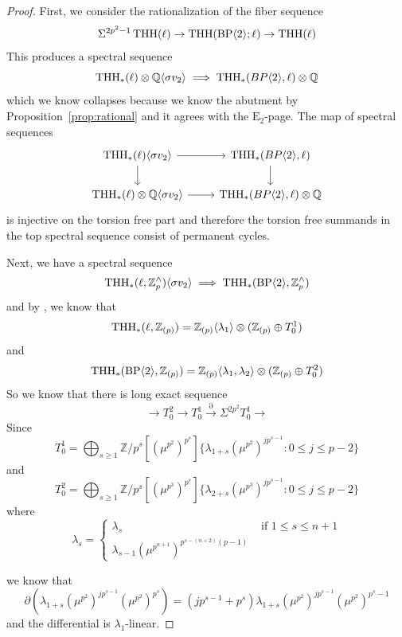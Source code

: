 \begin{proof}
First, we consider the rationalization of the fiber sequence 
\[ 
\Sigma^{2p^2-1}\operatorname{THH}(\ell)\to \operatorname{THH}(\mathrm{BP}\langle 2\rangle ;\ell)\to \operatorname{THH}(\ell)
\]
This produces a spectral sequence 
\[ 
\operatorname{THH}_*(\ell)\otimes \mathbb{Q}\langle \sigma v_2\rangle \implies \operatorname{THH}_*(BP\langle 2\rangle,\ell)\otimes \mathbb{Q}
\]
which we know collapses because we know the abutment by Proposition~\ref{prop:rational} and it agrees with the $\mathrm{E}_2$-page. The map of spectral sequences 
\[ 
\begin{tikzcd}
\THH_*(\ell)\langle \sigma v_2\rangle \ar[d] \arrow[=>]{r} & \THH_*(BP\langle 2\rangle,\ell)\ar[d] \\
\THH_*(\ell)\otimes \mathbb{Q}\langle \sigma v_2\rangle \arrow[=>]{r} & \THH_*(BP\langle 2\rangle,\ell)\otimes \mathbb{Q}
\end{tikzcd}
\]
is injective on the torsion free part and therefore the torsion free summands in the top spectral sequence consist of permanent cycles. 

Next, we have a spectral sequence 
\[ \operatorname{THH}_*(\ell,\mathbb{Z}_p^{\wedge})\langle \sigma v_2\rangle \implies \operatorname{THH}_*(\mathrm{BP}\langle 2\rangle,\mathbb{Z}_p^{\wedge})
\]
and by \cite[Theorem~3.18]{AKCH24}, we know that 
\[
\operatorname{THH}_*(\ell,\mathbb{Z}_{(p)})=\mathbb{Z}_{(p)}\langle \lambda_1\rangle \otimes (\mathbb{Z}_{(p)}\oplus T_0^1)
\]
and 
\[
\operatorname{THH}_*(\mathrm{BP}\langle 2\rangle,\mathbb{Z}_{(p)})=\mathbb{Z}_{(p)}\langle \lambda_1,\lambda_2\rangle \otimes (\mathbb{Z}_{(p)}\oplus T_0^2)
\]
So we know that there is long exact sequence 
\[ 
\to T_0^{2} \to T_0^1\overset{\partial}{\to} \Sigma^{2p^2}T_0^1 \to 
\]
Since 
\[ 
T_0^1=\bigoplus_{s\ge 1}\mathbb{Z}/p^s[(\mu^{p^2})^{p^s}]\{\lambda_{1+s}(\mu^{p^2})^{jp^{s-1}}: 0\le j\le p-2\}
\]
and 
\[ 
T_0^2=\bigoplus_{s\ge 1}\mathbb{Z}/p^s[(\mu^{p^3})^{p^s}]\{\lambda_{2+s}(\mu^{p^3})^{jp^{s-1}}: 0\le j\le p-2\}
\]
where 
\[ 
    \lambda_{s}=\begin{cases} \lambda_s & \text{ if } 1\le s\le n+1 \\ 
    \lambda_{s-1}(\mu^{p^{n+1}})^{p^{s-(n+2)}(p-1)}
    \end{cases}
\]

we know that 
\[ 
\partial(\lambda_{1+s}(\mu^{p^2})^{jp^{s-1}}(\mu^{p^2})^{p^s})=(jp^{s-1}+p^s)\lambda_{1+s}(\mu^{p^2})^{jp^{s-1}}(\mu^{p^2})^{p^s-1} 
\]
and the differential is $\lambda_1$-linear. 


\end{proof}
